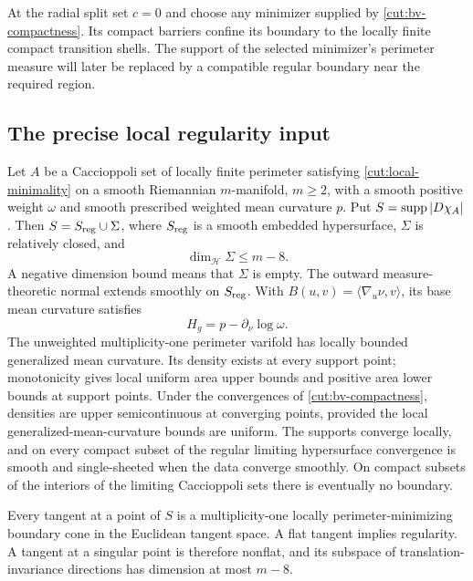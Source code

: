 At the radial split set $c=0$ and choose any minimizer supplied by
\cref{cut:bv-compactness}.  Its compact barriers confine its boundary to
the locally finite compact transition shells.  The support of the selected minimizer's perimeter measure will later be
replaced by a compatible regular boundary near the required region.

\subsection{The precise local regularity input}

\begin{theorem}\label{cut:gmt}
Let $A$ be a Caccioppoli set of locally finite perimeter satisfying
\eqref{cut:local-minimality} on a smooth Riemannian $m$-manifold,
$m\ge2$, with a smooth positive weight $\omega$ and smooth prescribed weighted mean curvature $p$.  Put
$S=\operatorname{supp}|D\chi_A|$.  Then $S=S_{\rm reg}\cup\Sigma$, where $S_{\rm reg}$
is a smooth embedded hypersurface, $\Sigma$ is relatively closed, and
\begin{equation}\label{cut:singular-dimension}
                         \dim_{\mathcal H}\Sigma\le m-8.
\end{equation}
A negative dimension bound means that $\Sigma$ is empty.  The outward
measure-theoretic normal extends smoothly on $S_{\rm reg}$.  With
$B(u,v)=\langle\nabla_u\nu,v\rangle$, its base mean curvature satisfies
\begin{equation}\label{cut:base-mean-curvature}
                    H_g=p-\partial_\nu\log\omega.
\end{equation}
The unweighted multiplicity-one perimeter varifold has locally bounded
generalized mean curvature.  Its density exists at every support point;
monotonicity gives local uniform area upper bounds and positive area
lower bounds at support points.  Under the convergences of
\cref{cut:bv-compactness}, densities are upper semicontinuous at
converging points, provided the local generalized-mean-curvature bounds
are uniform.  The supports converge locally, and on every compact
subset of the regular limiting hypersurface convergence is smooth and
single-sheeted when the data converge smoothly.  On compact subsets of
the interiors of the limiting Caccioppoli sets there is eventually no boundary.

Every tangent at a point of $S$ is a multiplicity-one locally
perimeter-minimizing boundary cone in the Euclidean tangent space.
A flat tangent implies regularity.  A tangent at a singular point is
therefore nonflat, and its subspace of translation-invariance directions has dimension
at most $m-8$.
\end{theorem}

